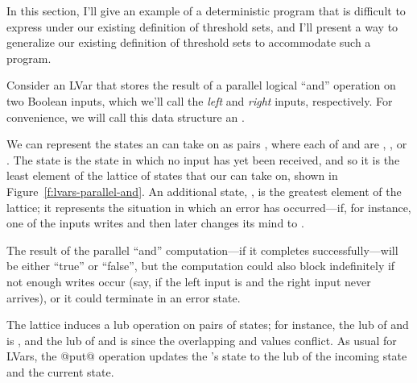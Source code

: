 In this section, I'll give an example of a deterministic program that
is difficult to express under our existing definition of threshold
sets, and I'll present a way to generalize our existing definition of
threshold sets to accommodate such a program.

Consider an LVar that stores the result of a parallel logical ``and''
operation on two Boolean inputs, which we'll call the \emph{left} and
\emph{right} inputs, respectively.  For convenience, we will call this
data structure an \emph{}.

We can represent the states an  can take on as pairs
, where each of  and  are , , or
.  The  state is the state in which no input has
yet been received, and so it is the least element of the lattice of
states that our  can take on, shown in
Figure~\ref{f:lvars-parallel-and}.  An additional state, , is
the greatest element of the lattice; it represents the situation in
which an error has occurred---if, for instance, one of the inputs
writes  and then later changes its mind to .

The result of the parallel ``and'' computation---if it completes
successfully---will be either ``true'' or ``false'', but the
computation could also block indefinitely if not enough writes occur
(say, if the left input is  and the right input never
arrives), or it could terminate in an error state.

The lattice induces a lub operation on pairs of states; for instance,
the lub of  and  is , and the lub of
 and  is  since the overlapping 
and  values conflict.  As usual for LVars, the @put@ operation
updates the 's state to the lub of the incoming state and
the current state.

